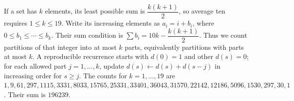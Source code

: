 If a set has $k$ elements, its least possible sum is $\dfrac{k(k+1)}{2}$, so average ten requires $1\le k\le19$. Write its increasing elements as $a_i=i+b_i$, where $0\le b_1\le\cdots\le b_k$. Their sum condition is $\sum b_i=10k-\dfrac{k(k+1)}{2}$. Thus we count partitions of that integer into at most $k$ parts, equivalently partitions with parts at most $k$. A reproducible recurrence starts with $d(0)=1$ and other $d(s)=0$; for each allowed part $j=1,\ldots,k$, update $d(s)\leftarrow d(s)+d(s-j)$ in increasing order for $s\ge j$. The counts for $k=1,\ldots,19$ are $1,9,61,297,1115,3331,8033,15765,25331,33401,36043,31570,22142,12186,5096,1530,297,30,1$. Their sum is $\boxed{196239}$.
